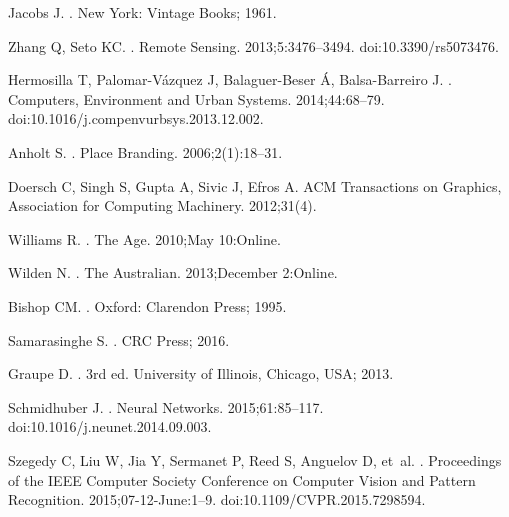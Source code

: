 Jacobs J.
.
\newblock New York: Vintage Books; 1961.

Zhang Q, Seto KC.
.
\newblock Remote Sensing. 2013;5:3476--3494.
\newblock doi:{10.3390/rs5073476}.

Hermosilla T, Palomar-V{\'{a}}zquez J, Balaguer-Beser {\'{A}}, Balsa-Barreiro
  J.
.
\newblock Computers, Environment and Urban Systems. 2014;44:68--79.
\newblock doi:{10.1016/j.compenvurbsys.2013.12.002}.

Anholt S.
.
\newblock Place Branding. 2006;2(1):18--31.

Doersch C, Singh S, Gupta A, Sivic J, Efros A.
\newblock ACM Transactions on Graphics, Association for Computing Machinery.
  2012;31(4).

Williams R.
.
\newblock The Age. 2010;May 10:Online.

Wilden N.
.
\newblock The Australian. 2013;December 2:Online.





Bishop CM.
.
\newblock Oxford: Clarendon Press; 1995.

Samarasinghe S.
.
\newblock CRC Press; 2016.

Graupe D.
.
\newblock 3rd ed. University of Illinois, Chicago, USA; 2013.

Schmidhuber J.
.
\newblock Neural Networks. 2015;61:85--117.
\newblock doi:{10.1016/j.neunet.2014.09.003}.

Szegedy C, Liu W, Jia Y, Sermanet P, Reed S, Anguelov D, et~al.
.
\newblock Proceedings of the IEEE Computer Society Conference on Computer
  Vision and Pattern Recognition. 2015;07-12-June:1--9.
\newblock doi:{10.1109/CVPR.2015.7298594}.

